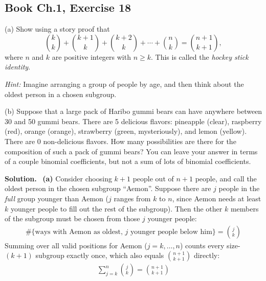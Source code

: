 \documentclass[11pt]{article}
\newcommand{\Sol}{\vspace{2pt}\noindent\textbf{Solution.}\ }
\begin{document}
\subsection{Book Ch.1, Exercise 18}
\begin{qbox}
(a) Show using a story proof that
\[
\binom{k}{k}+\binom{k+1}{k}+\binom{k+2}{k}+\cdots+\binom{n}{k}=\binom{n+1}{k+1},
\]
where $n$ and $k$ are positive integers with $n\ge k$. This is called the \emph{hockey stick identity}.

\emph{Hint:} Imagine arranging a group of people by age, and then think about the oldest person in a chosen subgroup.

(b) Suppose that a large pack of Haribo gummi bears can have anywhere between 30 and 50 gummi bears. There are 5 delicious flavors: pineapple (clear), raspberry (red), orange (orange), strawberry (green, mysteriously), and lemon (yellow). There are 0 non-delicious flavors. How many possibilities are there for the composition of such a pack of gummi bears? You can leave your answer in terms of a couple binomial coefficients, but not a sum of lots of binomial coefficients.
\end{qbox}
\Sol
\textbf{(a)} Consider choosing $k+1$ people out of $n+1$ people, and call the oldest person in the chosen subgroup ``Aemon''. Suppose there are $j$ people in the \emph{full} group younger than Aemon ($j$ ranges from $k$ to $n$, since Aemon needs at least $k$ younger people to fill out the rest of the subgroup). Then the other $k$ members of the subgroup must be chosen from those $j$ younger people:
\begin{align*}
\#\{\text{ways with Aemon as oldest, }j\text{ younger people below him}\} = \binom{j}{k}
\end{align*}
Summing over all valid positions for Aemon ($j=k,\dots,n$) counts every size-$(k+1)$ subgroup exactly once, which also equals $\binom{n+1}{k+1}$ directly:
\begin{align*}
\sum_{j=k}^{n}\binom{j}{k} = \binom{n+1}{k+1}
\end{align*}
\end{document}
